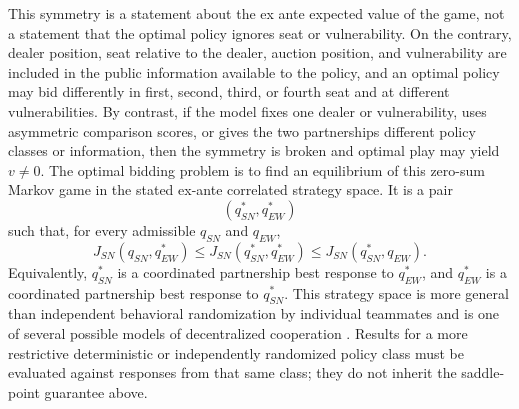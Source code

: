 \documentclass[11pt]{article}
\begin{document}
This symmetry is a statement about the ex ante expected value of the game, not a statement that the optimal policy ignores seat or vulnerability. On the contrary, dealer position, seat relative to the dealer, auction position, and vulnerability are included in the public information available to the policy, and an optimal policy may bid differently in first, second, third, or fourth seat and at different vulnerabilities. By contrast, if the model fixes one dealer or vulnerability, uses asymmetric comparison scores, or gives the two partnerships different policy classes or information, then the symmetry is broken and optimal play may yield $v\neq 0$.
The optimal bidding problem is to find an equilibrium of this zero-sum Markov game in the stated ex-ante correlated strategy space. It is a pair
\[
    (q_{SN}^\ast,q_{EW}^\ast)
\]
such that, for every admissible $q_{SN}$ and $q_{EW}$,
\[
    J_{SN}(q_{SN},q_{EW}^\ast)
    \leq
    J_{SN}(q_{SN}^\ast,q_{EW}^\ast)
    \leq
    J_{SN}(q_{SN}^\ast,q_{EW}).
\]
Equivalently, $q_{SN}^\ast$ is a coordinated partnership best response to $q_{EW}^\ast$, and $q_{EW}^\ast$ is a coordinated partnership best response to $q_{SN}^\ast$. This strategy space is more general than independent behavioral randomization by individual teammates and is one of several possible models of decentralized cooperation \cite{farina2018coordination,farina2021collusion}. Results for a more restrictive deterministic or independently randomized policy class must be evaluated against responses from that same class; they do not inherit the saddle-point guarantee above.
\end{document}

